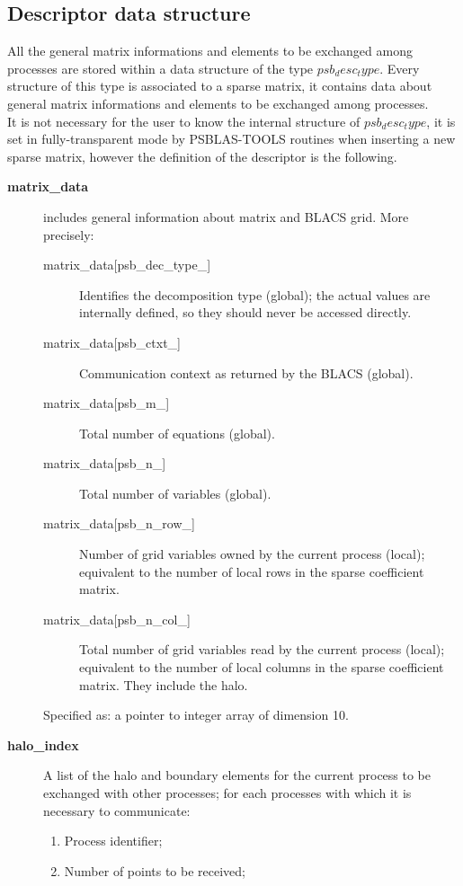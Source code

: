\subsection{Descriptor data structure}
\label{sec:desc}
All the general matrix informations and elements to be
exchanged among processes are stored within a data structure of the type $psb_desc_type$. 
Every structure of this type is associated to a sparse matrix, it
contains data about general matrix informations and elements to be
exchanged among processes.  \\ 
It is not necessary for the user to
know the internal structure of $psb_desc_type$, it is set in
fully-transparent mode by PSBLAS-TOOLS routines when inserting a new
sparse matrix, however the definition of the descriptor is the
following.  
\begin{description}
\item[{\bf matrix\_data}] includes general information about matrix and
BLACS grid. More precisely:
\begin{description}
\item[matrix\_data[psb\_dec\_type\_\hbox{]}] Identifies the decomposition type
(global); the actual values are internally defined, so they should
never be accessed directly.
\item[matrix\_data[psb\_ctxt\_\hbox{]}] Communication context as returned by the
BLACS (global).
\item[matrix\_data[psb\_m\_\hbox{]}] Total number of equations (global).
\item[matrix\_data[psb\_n\_\hbox{]}] Total number of variables (global).
\item[matrix\_data[psb\_n\_row\_\hbox{]}] Number of grid variables owned by the
current process (local); equivalent to the number of local rows in the
sparse coefficient matrix.
\item[matrix\_data[psb\_n\_col\_\hbox{]}] Total number of grid variables read by the
current process (local); equivalent to the number of local columns in
the sparse coefficient matrix. They include the halo.
\end{description}
Specified as: a pointer to integer array of dimension 10.
\item[{\bf halo\_index}] A list of the halo and boundary elements for
the current process to be exchanged with other processes; for each
processes with which it is necessary to communicate:
\begin{enumerate}
\item Process identifier;
\item Number of points to be received;

\end{enumerate}
\end{description}

